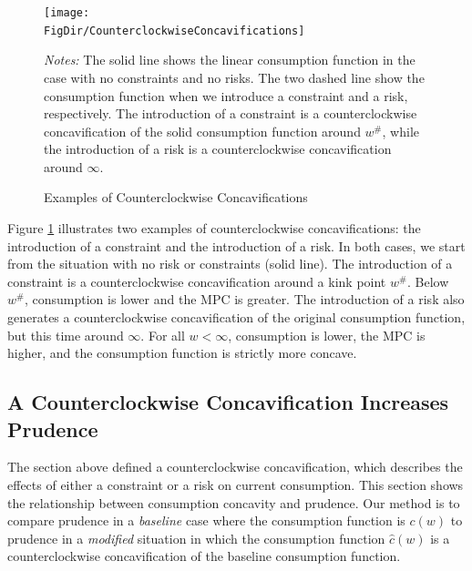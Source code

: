 \documentclass[titlepage]{\econtex}
\begin{document}
  \hypertarget{CounterclockwiseConcavifications}{}

  \begin{figure}[ht]
    {\centering
      \texttt{[image: \\FigDir/CounterclockwiseConcavifications]}}
    \caption{Examples of Counterclockwise Concavifications}
    {\footnotesize \begin{singlespace} {\emph{Notes:} The solid line shows the linear consumption function in the case with no constraints and no risks. The two dashed line show the consumption function when we introduce a constraint and a risk, respectively. The introduction of a constraint is a counterclockwise concavification of the solid consumption function around $w^{\#}$, while the introduction of a risk is a counterclockwise concavification around $\infty$.}  \end{singlespace}}
    \label{fig:counterclockwise}
  \end{figure}

  \noindent Figure \ref{fig:counterclockwise} illustrates two examples of counterclockwise concavifications: the introduction of a constraint and the introduction of a risk. In both cases, we start from the situation with no risk or constraints (solid line). The introduction of a constraint is a counterclockwise concavification around a kink point $w^{\#}$. Below $w^{\#}$, consumption is lower and the MPC is greater. The introduction of a risk also generates a counterclockwise concavification of the original consumption function, but this time around $\infty$. For all $w < \infty$, consumption is lower, the MPC is higher, and the consumption function is strictly more concave.




  \subsection{A Counterclockwise Concavification Increases Prudence}\label{sec:CCPrud}
  The section above defined a counterclockwise concavification, which describes the effects of either a constraint or a risk on current consumption. This section shows the relationship between consumption concavity and prudence. Our method is to compare prudence in a \textit{baseline} case where the consumption function is $c(w)$ to prudence in a \textit{modified} situation in which the consumption function $\hat{c}(w)$ is a counterclockwise concavification of the baseline consumption function. 
\end{document}
